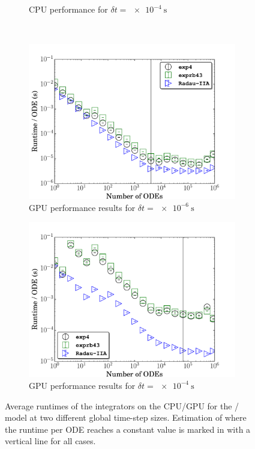 \documentclass[final,twocolumn]{elsarticle}
\begin{document}
\begin{figure}[htb]
\begin{subfigure}{0.49\textwidth}
      \caption{CPU performance for $\delta t = \SI{e-4}{\second}$}
      \label{F:h2_cpu_perf_large}
  \end{subfigure}\\
  \begin{subfigure}{0.49\textwidth}
      \includegraphics[width=\linewidth]{H2_1e-06_gpu.pdf}
      \caption{GPU performance results for $\delta t = \SI{e-6}{\second}$}
      \label{F:h2_gpu_perf_small}
  \end{subfigure}
  \begin{subfigure}{0.49\textwidth}
      \includegraphics[width=\linewidth]{H2_1e-04_gpu.pdf}
      \caption{GPU performance results for $\delta t = \SI{e-4}{\second}$}
      \label{F:h2_gpu_perf_large}
  \end{subfigure}
  \caption{Average runtimes of the integrators on the CPU\slash GPU for the \slash{} model at two different global time-step sizes.
  Estimation of where the runtime per ODE reaches a constant value is marked in with a vertical line for all cases.}
  \label{F:H2_perf}
\end{figure}
\end{document}
